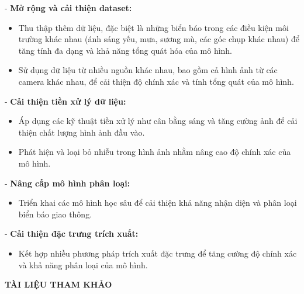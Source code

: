 \documentclass[a4paper,12pt]{article}
\begin{document}
\hspace{6mm}- \textbf{Mở rộng và cải thiện dataset:}
    \begin{itemize}
        \item Thu thập thêm dữ liệu, đặc biệt là những biển báo trong các điều kiện môi trường khác nhau (ánh sáng yếu, mưa, sương mù, các góc chụp khác nhau) để tăng tính đa dạng và khả năng tổng quát hóa của mô hình.
        \item Sử dụng dữ liệu từ nhiều nguồn khác nhau, bao gồm cả hình ảnh từ các camera khác nhau, để cải thiện độ chính xác và tính tổng quát của mô hình.
    \end{itemize}

- \textbf{Cải thiện tiền xử lý dữ liệu:}
    \begin{itemize}
        \item Áp dụng các kỹ thuật tiền xử lý như cân bằng sáng và tăng cường ảnh để cải thiện chất lượng hình ảnh đầu vào.
        \item Phát hiện và loại bỏ nhiễu trong hình ảnh nhằm nâng cao độ chính xác của mô hình.
    \end{itemize}

- \textbf{Nâng cấp mô hình phân loại:}
    \begin{itemize}
        \item Triển khai các mô hình học sâu để cải thiện khả năng nhận diện và phân loại biển báo giao thông.
    \end{itemize}

- \textbf{Cải thiện đặc trưng trích xuất:}
    \begin{itemize}
        \item Kết hợp nhiều phương pháp trích xuất đặc trưng để tăng cường độ chính xác và khả năng phân loại của mô hình.
    \end{itemize}

\newpage
\thispagestyle{empty}
\begin{center}
    \textbf{\large TÀI LIỆU THAM KHẢO}
\end{center}
\vspace{1cm}
\sloppy
\printbibliography
\end{document}
